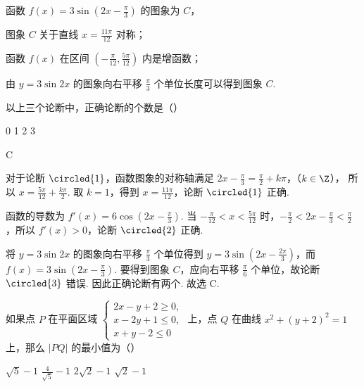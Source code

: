 \begin{problem}
函数 \( f(x) = 3\sin \left(2x - \frac{\pi}{3}\right) \) 的图象为 \(C\)，

\begin{circlelist}
\item 图象 \(C\) 关于直线 \( x = \frac{11\pi}{12} \) 对称；
\item 函数 \( f(x) \) 在区间 \( \left(-\frac{\pi}{12}, \frac{5\pi}{12}\right) \) 内是增函数；
\item 由 \(y = 3\sin 2x\) 的图象向右平移 \(\frac{\pi}{3}\) 个单位长度可以得到图象 \(C\).
\end{circlelist}

以上三个论断中，正确论断的个数是（\quad）

\choices
    {0}
    {1}
    {2}
    {3}
\end{problem}

\begin{answer}
C
\end{answer}

\begin{solution}
对于论断 \(\circled{1}\)，函数图象的对称轴满足
\(2x-\frac{\pi}{3}=\frac{\pi}{2}+k\pi\)，（\(k\in\Z\)），
所以 \(x=\frac{5\pi}{12}+\frac{k\pi}{2}\). 取 \(k=1\)，得到 \(x=\frac{11\pi}{12}\)，论断 \(\circled{1}\) 正确.

函数的导数为 \(f'(x)=6\cos(2x-\frac{\pi}{3})\). 当 \(-\frac{\pi}{12}<x<\frac{5\pi}{12}\) 时，\(-\frac{\pi}{2}<2x-\frac{\pi}{3}<\frac{\pi}{2}\)，所以 \(f'(x)>0\)，论断 \(\circled{2}\) 正确.

将 \(y=3\sin2x\) 的图象向右平移 \(\frac{\pi}{3}\) 个单位得到 \(y=3\sin(2x-\frac{2\pi}{3})\)，而 \(f(x)=3\sin(2x-\frac{\pi}{3})\). 要得到图象 \(C\)，应向右平移 \(\frac{\pi}{6}\) 个单位，故论断 \(\circled{3}\) 错误. 因此正确论断有两个. 故选 C.
\end{solution}

\begin{problem}
如果点 \(P\) 在平面区域 \(\begin{cases}
2x - y + 2 \geqslant 0,\\
x - 2y + 1 \leqslant 0,\\
x + y - 2 \leqslant 0
\end{cases}\) 上，点 \(Q\) 在曲线 \(x^{2} + (y + 2)^{2} = 1\) 上，那么 \(|PQ|\) 的最小值为（\quad）

\choices
    {\(\sqrt{5} - 1\)}
    {\(\frac{4}{\sqrt{5}} - 1\)}
    {\(2\sqrt{2} - 1\)}
    {\(\sqrt{2} - 1\)}
\end{problem}

